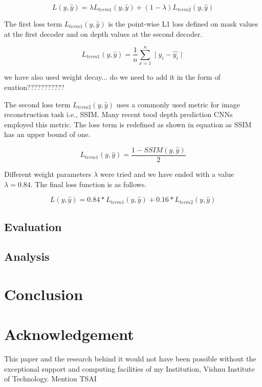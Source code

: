 \documentclass[review]{cvpr}
\begin{document}
\begin{equation}
L(y, \hat{y}) = \lambda L_{term1}(y, \hat{y}) + (1 - \lambda) L_{term2}(y, \hat{y})
\end{equation}

The first loss term $L_{term1}(y, \hat{y})$ is the point-wise L1 loss defined on mask values at the first decoder and 
on depth values at the second decoder.

\begin{equation}
L_{term1}(y, \hat{y}) = \frac{1}{n} \sum_{x=1}^{n} \mid y_i - \hat{y_i} \mid
\end{equation}

we have also used weight decay... do we need to add it in the form of euation???????????

The second loss term $L_{term2}(y, \hat{y})$ uses a commonly used metric for image reconstruction task i.e., SSIM. 
Many recent tood depth prediction CNNs employed this metric. 
The loss term is redefined as shown in equation as SSIM has an upper bound of one.

\begin{equation}
L_{term1}(y, \hat{y}) = \frac{1 - SSIM(y, \hat{y})}{2}
\end{equation}

Different weight parameters $\lambda$ were tried and we have ended with a value $\lambda = 0.84$. The final loss function is as follows.

\begin{equation}
L(y, \hat{y}) = 0.84 \ast L_{term1}(y, \hat{y}) + 0.16 \ast L_{term2}(y, \hat{y})
\end{equation}

\subsection{Evaluation}
\subsection{Analysis}
\section{Conclusion}
\section{Acknowledgement}
This paper and the research behind it would not have been possible without the exceptional support and computing facilities of my Institution, Vishnu Institute of Technology. Mention TSAI

{\small


}
\end{document}
